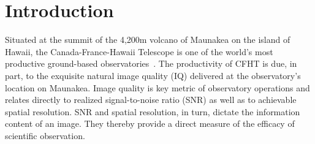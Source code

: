 \section{Introduction}\label{sec:introduction}

Situated at the summit of the 4,200m volcano of Maunakea on the island of Hawaii, the Canada-France-Hawaii Telescope is one of the world's most productive ground-based observatories~\citep{crabtree:2019}. The productivity of CFHT is due, in part, to the exquisite natural image quality (IQ) delivered at the observatory's location on Maunakea. Image quality is key metric of observatory operations and relates directly  to  realized signal-to-noise ratio (SNR) as well as to achievable spatial resolution. SNR and spatial resolution, in turn, dictate the information content of an image.  They thereby provide a direct measure of the efficacy of scientific observation.


